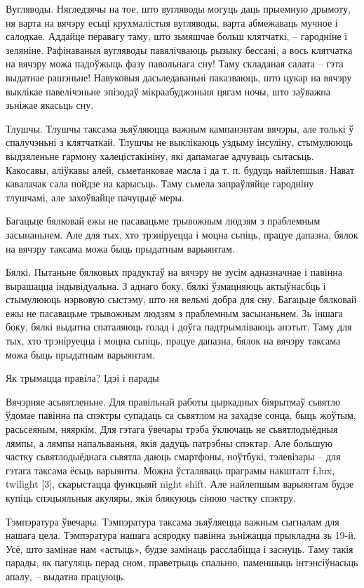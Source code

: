 Вугляводы.
Нягледзячы на тое, што вугляводы могуць даць прыемную дрымоту, ня варта на вячэру есьці крухмалістыя вугляводы, варта абмежаваць мучное і салодкае. Аддайце перавагу таму, што зьмяшчае больш клятчаткі, – гародніне і зеляніне. Рафінаваныя вугляводы павялічваюць рызыку бессані, а вось клятчатка на вячэру можа падоўжыць фазу павольнага сну! Таму складаная салата – гэта выдатнае рашэньне! Навуковыя дасьледаваньні паказваюць, што цукар на вячэру выклікае павелічэньне эпізодаў мікраабуджэньня цягам ночы, што заўважна зьніжае якасьць сну.

Тлушчы.
Тлушчы таксама зьяўляюцца важным кампанэнтам вячэры, але толькі ў спалучэньні з клятчаткай. Тлушчы не выклікаюць уздыму інсуліну, стымулююць выдзяленьне гармону халецістакініну, які дапамагае адчуваць сытасьць. Какосавы, аліўкавы алей, сьметанковае масла і да т. п. будуць найлепшыя. Нават кавалачак сала пойдзе на карысьць. Таму сьмела запраўляйце гародніну тлушчамі, але захоўвайце пачуцьцё меры.

Багацьце бялковай ежы не пасавацьме трывожным людзям з праблемным засынаньнем. Але для тых, хто трэніруецца і моцна сьпіць, працуе дапазна, бялок на вячэру таксама можа быць прыдатным варыянтам.

Бялкі.
Пытаньне бялковых прадуктаў на вячэру не зусім адназначнае і павінна вырашацца індывідуальна. З аднаго боку, бялкі ўзмацняюць актыўнасбць і стымулююць нэрвовую сыстэму, што ня вельмі добра для сну. Багацьце бялковай ежы не пасавацьме трывожным людзям з праблемным засынаньнем. Зь іншага боку, бялкі выдатна спаталяюць голад і доўга падтрымліваюць апэтыт. Таму для тых, хто трэніруецца і моцна сьпіць, працуе дапазна, бялок на вячэру таксама можа быць прыдатным варыянтам.

Як трымацца правіла? Ідэі і парады

Вячэрняе асьвятленьне.
Для правільнай работы цыркадных біярытмаў сьвятло ўдомае павінна па спэктры супадаць са сьвятлом на захадзе сонца, быць жоўтым, расьсеяным, няяркім. Для гэтага ўвечары трэба ўключаць не сьвятлодыёдныя лямпы, а лямпы напальваньня, якія дадуць патрэбны спэктар. Але большую частку сьвятлодыёднага сьвятла даюць смартфоны, ноўтбукі, тэлевізары – для гэтага таксама ёсьць варыянты. Можна ўсталяваць праграмы накшталт f.lux, twilight [3], скарыстацца функцыяй night shift. Але найлепшым варыянтам будзе купіць спэцыяльныя акуляры, якія блякуюць сінюю частку спэктру.

Тэмпэратура ўвечары.
Тэмпэратура таксама зьяўляецца важным сыгналам для нашага цела. Тэмпэратура нашага асяродку павінна зьніжацца прыкладна зь 19-й. Усё, што замінае нам «астыць», будзе замінаць расслабіцца і заснуць. Таму такія парады, як пагуляць перад сном, праветрыць спальню, паменшыць інтэнсіўнасьць апалу, – выдатна працуюць.

